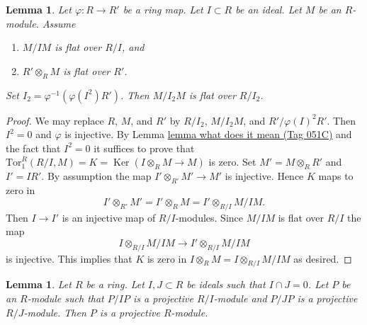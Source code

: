 \documentclass{amsart}
\theoremstyle{plain}
\newtheorem{lemma}[subsection]{Lemma}
\theoremstyle{definition}
\theoremstyle{remark}
\numberwithin{equation}{subsection}
\def\Ker{\mathop{\mathrm{Ker}}}
\begin{document}
\begin{lemma}
\label{algebra-lemma-prepare-lift-flatness}
Let $\varphi : R \to R'$ be a ring map.
Let $I \subset R$ be an ideal.
Let $M$ be an $R$-module.
Assume
\begin{enumerate}
\item $M/IM$ is flat over $R/I$, and
\item $R' \otimes_R M$ is flat over $R'$.
\end{enumerate}
Set $I_2 = \varphi^{-1}(\varphi(I^2)R')$.
Then $M/I_2M$ is flat over $R/I_2$.
\end{lemma}

\begin{proof}
We may replace $R$, $M$, and $R'$ by $R/I_2$, $M/I_2M$, and
$R'/\varphi(I)^2R'$. Then $I^2 = 0$ and $\varphi$ is injective. By
Lemma \href{https://stacks.math.columbia.edu/tag/051C}{lemma what does it mean (Tag 051C)}
and the fact that $I^2 = 0$ it suffices to prove that
$\text{Tor}^R_1(R/I, M) = K = \Ker(I \otimes_R M \to M)$ is zero.
Set $M' = M \otimes_R R'$ and $I' = IR'$.
By assumption the map $I' \otimes_{R'} M' \to M'$ is injective.
Hence $K$ maps to zero in
$$
I' \otimes_{R'} M' = I' \otimes_R M = I' \otimes_{R/I} M/IM.
$$
Then $I \to I'$ is an injective map of $R/I$-modules.
Since $M/IM$ is flat over $R/I$ the map
$$
I \otimes_{R/I} M/IM \longrightarrow I' \otimes_{R/I} M/IM
$$
is injective. This implies that $K$ is zero in
$I \otimes_R M = I \otimes_{R/I} M/IM$ as desired.
\end{proof}


\begin{lemma}
\label{algebra-lemma-projective-modulo-two-ideals}
Let $R$ be a ring. Let $I, J \subset R$ be ideals such that $I \cap J = 0$.
Let $P$ be an $R$-module such that $P/IP$ is a projective $R/I$-module and
$P/JP$ is a projective $R/J$-module. Then $P$ is a projective $R$-module.
\end{lemma}
\end{document}
